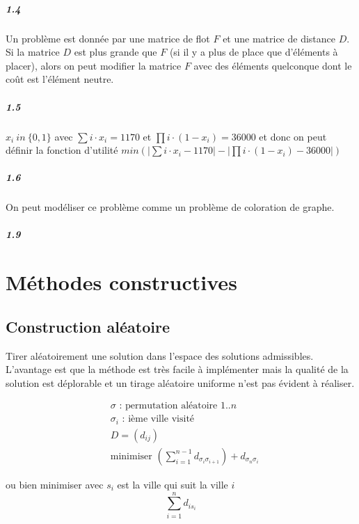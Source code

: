 \documentclass[11pt,a4paper]{report}
\begin{document}
\paragraph*{1.4} Un problème est donnée par une matrice de flot $F$ et une matrice de distance $D$. Si la matrice $D$ est plus grande que $F$ (si il y a plus de place que d'éléments à placer), alors on peut modifier la matrice $F$ avec des éléments quelconque dont le coût est l'élément neutre.

\paragraph*{1.5} $x_i\ in \ \{0,1\}$ avec $\sum i \cdot x_i = 1170$ et $\prod i \cdot (1-x_i) = 36000$ et donc on peut définir la fonction d'utilité $min(|\sum i \cdot x_i - 1170| - |\prod i \cdot (1-x_i) - 36000|)$

\paragraph*{1.6} On peut modéliser ce problème comme un problème de coloration de graphe.

\paragraph*{1.9} 

\chapter{Méthodes constructives}

\section{Construction aléatoire}
Tirer aléatoirement une solution dans l'espace des solutions admissibles. L'avantage est que la méthode est très facile à implémenter mais la qualité de la solution est déplorable et un tirage aléatoire uniforme n'est pas évident à réaliser.

\begin{align*}
& \sigma \text{ : permutation aléatoire } 1..n \\
& \sigma_i \text{ : ième ville visité}\\
& D = (d_{ij})\\
& \text{minimiser } (\sum_{i=1}^{n-1} d_{\sigma_i \sigma_{i+1}}) + d_{\sigma_n \sigma_i}
\end{align*}

ou bien minimiser avec $s_i$ est la ville qui suit la ville $i$
$$
\sum_{i=1}^n d_{i s_i}
$$
\end{document}
